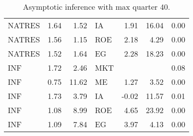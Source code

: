 \documentclass[12pt]{article}
\begin{document}
\begin{table}[ht]
\begin{tabular}{lrrlrrr}
		NATRES & 1.64 & 1.52 & IA & 1.91 & 16.04 & 0.00 \\ 
		NATRES & 1.56 & 1.15 & ROE & 2.18 & 4.29 & 0.00 \\ 
		NATRES & 1.52 & 1.64 & EG & 2.28 & 18.23 & 0.00 \\ 
		\hline
		INF & 1.72 & 2.46 & MKT &  &  & 0.08 \\ 
		INF & 0.75 & 11.62 & ME & 1.27 & 3.52 & 0.00 \\ 
		INF & 1.73 & 3.79 & IA & -0.02 & 11.57 & 0.01 \\ 
		INF & 1.08 & 8.99 & ROE & 4.65 & 23.92 & 0.00 \\ 
		INF & 1.09 & 7.84 & EG & 3.97 & 4.13 & 0.00 \\ 
		\hline
	\end{tabular}
	\caption{Asymptotic inference with max quarter 40.} 
\end{table}
\end{document}
